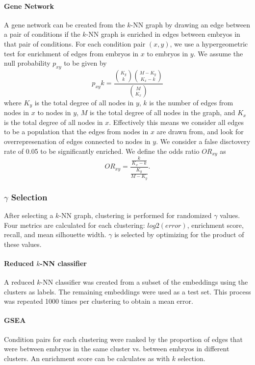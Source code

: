 \documentclass{article}
\begin{document}
\paragraph{Gene Network}
A gene network can be created from the $k$-NN graph by drawing an edge between a pair of conditions if the $k$-NN graph is enriched in edges between embryos in that pair of conditions.
For each condition pair $(x,y)$, we use a hypergeometric test for enrichment of edges from embryos in $x$ to embryos in $y$.
We assume the null probability $p_{xy}$ to be given by
\begin{equation}
p_{xy}k = \frac{\binom{K_y}{k}\binom{M-K_y}{K_x-k}}{\binom{M}{K_x}}
\end{equation}
where $K_y$ is the total degree of all nodes in $y$, $k$ is the number of edges from nodes in $x$ to nodes in $y$, $M$ is the total degree of all nodes in the graph, and $K_x$ is the total degree of all nodes in $x$. 
Effectively this means we consider all edges to be a population that the edges from nodes in $x$ are drawn from, and look for overrepresenation of edges connected to nodes in $y$. We consider a false disctovery rate of 0.05 to be significantly enriched. 
We define the odds ratio $OR_{xy}$ as
\begin{equation}
OR_{xy} = \frac{\frac{k}{K_x-k}}{\frac{K_y}{M-K_y}}.
\end{equation}
\subsubsection{$\gamma$ Selection}
After selecting a $k$-NN graph, clustering is performed for randomized $\gamma$ values. Four metrics are calculated for each clustering: $log2(error)$, enrichment score, recall, and mean silhouette width. $\gamma$ is selected by optimizing for the product of these values.
\paragraph{Reduced $k$-NN classifier}
A reduced $k$-NN classifier was created from a subset of the embeddings using the clusters as labels. The remaining embeddings were used as a test set. This process was repeated 1000 times per clustering to obtain a mean error.

\paragraph{GSEA}
Condition pairs for each clustering were ranked by the proportion of edges that were between embryos in the same cluster vs. between embryos in different clusters. An enrichment score can be calculates as with $k$ selection.
\end{document}
